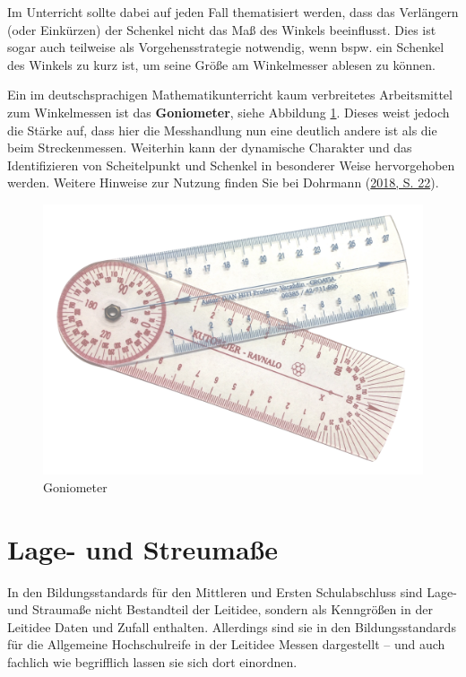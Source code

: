 \documentclass[
]{scrbook}
\theoremstyle{definition}
\theoremstyle{definition}
\theoremstyle{definition}
\theoremstyle{definition}
\theoremstyle{remark}
\begin{document}
Im Unterricht sollte dabei auf jeden Fall thematisiert werden, dass das Verlängern (oder Einkürzen) der Schenkel nicht das Maß des Winkels beeinflusst. Dies ist sogar auch teilweise als Vorgehensstrategie notwendig, wenn bspw. ein Schenkel des Winkels zu kurz ist, um seine Größe am Winkelmesser ablesen zu können.

Ein im deutschsprachigen Mathematikunterricht kaum verbreitetes Arbeitsmittel zum Winkelmessen ist das \textbf{Goniometer}, siehe Abbildung \ref{fig:Goniometer}. Dieses weist jedoch die Stärke auf, dass hier die Messhandlung nun eine deutlich andere ist als die beim Streckenmessen. Weiterhin kann der dynamische Charakter und das Identifizieren von Scheitelpunkt und Schenkel in besonderer Weise hervorgehoben werden. Weitere Hinweise zur Nutzung finden Sie bei Dohrmann (\protect\hyperlink{ref-Dohrmann2018}{2018, S. 22}).

\begin{figure}

{\centering \includegraphics[width=0.75\linewidth]{pictures/11-Goniometer} 

}

\caption{Goniometer}\label{fig:Goniometer}
\end{figure}

\hypertarget{lage--und-streumauxdfe}{%
\section{Lage- und Streumaße}\label{lage--und-streumauxdfe}}

In den Bildungsstandards für den Mittleren und Ersten Schulabschluss sind Lage- und Straumaße nicht Bestandteil der Leitidee, sondern als Kenngrößen in der Leitidee Daten und Zufall enthalten. Allerdings sind sie in den Bildungsstandards für die Allgemeine Hochschulreife in der Leitidee Messen dargestellt -- und auch fachlich wie begrifflich lassen sie sich dort einordnen.
\end{document}
